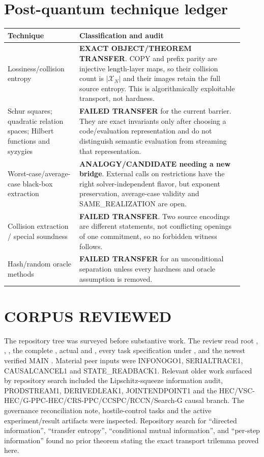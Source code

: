 \documentclass[11pt]{article}
\begin{document}
\section{Post-quantum technique ledger}
\begin{longtable}{p{0.28\linewidth}p{0.64\linewidth}}
\toprule
Technique & Classification and audit\\ \midrule
Lossiness/collision entropy & \textbf{EXACT OBJECT/THEOREM TRANSFER}.  COPY and prefix parity are injective length-layer maps, so their collision count is $|\mathcal X_N|$ and their images retain the full source entropy.  This is algorithmically exploitable transport, not hardness.\\
Schur squares; quadratic relation spaces; Hilbert functions and syzygies & \textbf{FAILED TRANSFER} for the current barrier.  They are exact invariants only after choosing a code/evaluation representation and do not distinguish semantic evaluation from streaming that representation.\\
Worst-case/average-case black-box extraction & \textbf{ANALOGY/CANDIDATE needing a new bridge}.  External calls on restrictions have the right solver-independent flavor, but exponent preservation, average-case validity and SAME\_REALIZATION are open.\\
Collision extraction / special soundness & \textbf{FAILED TRANSFER}.  Two source encodings are different statements, not conflicting openings of one commitment, so no forbidden witness follows.\\
Hash/random oracle methods & \textbf{FAILED TRANSFER} for an unconditional separation unless every hardness and oracle assumption is removed.\\
\bottomrule
\end{longtable}

\section{CORPUS REVIEWED}
The repository tree was surveyed before substantive work.  The review read
root , , , the complete
, actual  and
, every task specification under , and the newest
verified MAIN .
Material peer inputs were INFONOGO1, SERIALTRACE1, CAUSALCANCEL1 and
STATE\_READBACK1.  Relevant older work surfaced by repository search included
the Lipschitz-squeeze information audit, PRODSTREAM1, DERIVEDLEAK1,
JOINTENDPOINT1 and the HEC/VSC-HEC/G-PPC-HEC/CRS-PPC/CCSPC/RCCN/Search-G
causal branch.  The governance reconciliation note, hostile-control tasks and
the active experiment/result artifacts were inspected.  Repository search for
``directed information'', ``transfer entropy'', ``conditional mutual
information'', and ``per-step information'' found no prior theorem stating
the exact transport trilemma proved here.
\end{document}
